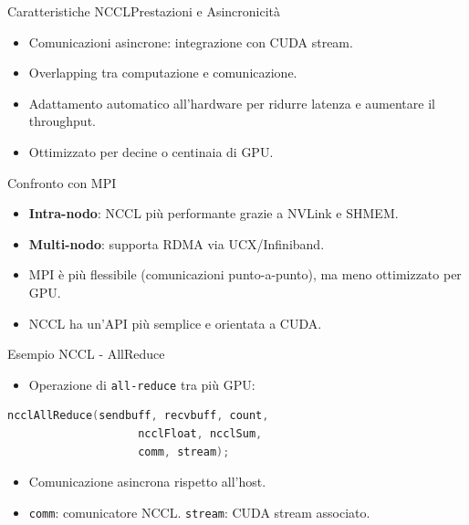 \begin{frame}{Caratteristiche NCCL}{Prestazioni e Asincronicità}
    \begin{itemize}
        \item Comunicazioni asincrone: integrazione con CUDA stream.
        \item Overlapping tra computazione e comunicazione.
        \item Adattamento automatico all’hardware per ridurre latenza e aumentare il throughput.
        \item Ottimizzato per decine o centinaia di GPU.
    \end{itemize}
\end{frame}

\begin{frame}{Confronto con MPI}
    \begin{itemize}
        \item \textbf{Intra-nodo}: NCCL più performante grazie a NVLink e SHMEM.
        \item \textbf{Multi-nodo}: supporta RDMA via UCX/Infiniband.
        \item MPI è più flessibile (comunicazioni punto-a-punto), ma meno ottimizzato per GPU.
        \item NCCL ha un'API più semplice e orientata a CUDA.
    \end{itemize}
\end{frame}

\begin{frame}[fragile]{Esempio NCCL - AllReduce}
    \begin{itemize}
        \item Operazione di \texttt{all-reduce} tra più GPU:
    \end{itemize}

    \begin{lstlisting}[language=C++, basicstyle=\ttfamily\small, keywordstyle=\color{blue}]
        ncclAllReduce(sendbuff, recvbuff, count,
                    ncclFloat, ncclSum,
                    comm, stream);
    \end{lstlisting}

    \begin{itemize}
        \item Comunicazione asincrona rispetto all’host.
        \item \texttt{comm}: comunicatore NCCL. \texttt{stream}: CUDA stream associato.
    \end{itemize}
\end{frame}

